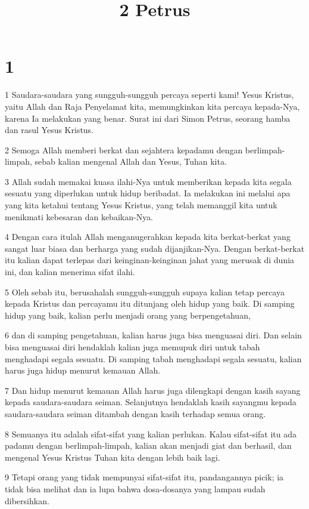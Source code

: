 

\title{2 Petrus}


\chapter{1}

\par 1 Saudara-saudara yang sungguh-sungguh percaya seperti kami! Yesus Kristus, yaitu Allah dan Raja Penyelamat kita, memungkinkan kita percaya kepada-Nya, karena Ia melakukan yang benar. Surat ini dari Simon Petrus, seorang hamba dan rasul Yesus Kristus.
\par 2 Semoga Allah memberi berkat dan sejahtera kepadamu dengan berlimpah-limpah, sebab kalian mengenal Allah dan Yesus, Tuhan kita.
\par 3 Allah sudah memakai kuasa ilahi-Nya untuk memberikan kepada kita segala sesuatu yang diperlukan untuk hidup beribadat. Ia melakukan ini melalui apa yang kita ketahui tentang Yesus Kristus, yang telah memanggil kita untuk menikmati kebesaran dan kebaikan-Nya.
\par 4 Dengan cara itulah Allah menganugerahkan kepada kita berkat-berkat yang sangat luar biasa dan berharga yang sudah dijanjikan-Nya. Dengan berkat-berkat itu kalian dapat terlepas dari keinginan-keinginan jahat yang merusak di dunia ini, dan kalian menerima sifat ilahi.
\par 5 Oleh sebab itu, berusahalah sungguh-sungguh supaya kalian tetap percaya kepada Kristus dan percayamu itu ditunjang oleh hidup yang baik. Di samping hidup yang baik, kalian perlu menjadi orang yang berpengetahuan,
\par 6 dan di samping pengetahuan, kalian harus juga bisa menguasai diri. Dan selain bisa menguasai diri hendaklah kalian juga memupuk diri untuk tabah menghadapi segala sesuatu. Di samping tabah menghadapi segala sesuatu, kalian harus juga hidup menurut kemauan Allah.
\par 7 Dan hidup menurut kemauan Allah harus juga dilengkapi dengan kasih sayang kepada saudara-saudara seiman. Selanjutnya hendaklah kasih sayangmu kepada saudara-saudara seiman ditambah dengan kasih terhadap semua orang.
\par 8 Semuanya itu adalah sifat-sifat yang kalian perlukan. Kalau sifat-sifat itu ada padamu dengan berlimpah-limpah, kalian akan menjadi giat dan berhasil, dan mengenal Yesus Kristus Tuhan kita dengan lebih baik lagi.
\par 9 Tetapi orang yang tidak mempunyai sifat-sifat itu, pandangannya picik; ia tidak bisa melihat dan ia lupa bahwa dosa-dosanya yang lampau sudah dibersihkan.

